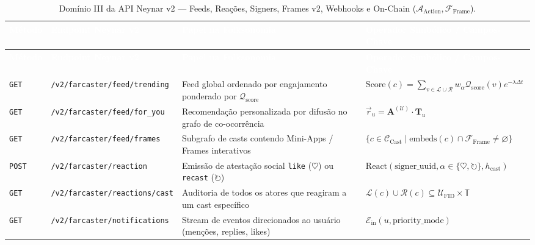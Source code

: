 \documentclass[11pt,a4paper]{article}
\begin{document}
\begin{longtable}{@{}p{1.15cm}>{\raggedright\arraybackslash}p{5.65cm}>{\raggedright\arraybackslash}p{4.15cm}>{\raggedright\arraybackslash}p{4.85cm}@{}}
\caption{Domínio III da API Neynar v2 --- Feeds, Reações, Signers, Frames v2, Webhooks e On-Chain ($\mathcal{A}_{\text{Action}}, \mathcal{F}_{\text{Frame}}$).}\label{tab:neynar_actions}\\
\toprule
\rowcolor{fcDeep}
\textcolor{white}{\textbf{Método}} & \textcolor{white}{\textbf{Endpoint Neynar v2}} & \textcolor{white}{\textbf{Papel na Folksonomia}} & \textcolor{white}{\textbf{Operador Simbólico / Campos-Chave}} \\
\midrule
\endfirsthead
\toprule
\rowcolor{fcDeep}
\textcolor{white}{\textbf{Método}} & \textcolor{white}{\textbf{Endpoint Neynar v2}} & \textcolor{white}{\textbf{Papel na Folksonomia}} & \textcolor{white}{\textbf{Operador Simbólico / Campos-Chave}} \\
\midrule
\endhead
\bottomrule
\endlastfoot
\texttt{GET} & \texttt{/v2/farcaster/feed/trending} & Feed global ordenado por engajamento ponderado por $\mathcal{Q}_{\text{score}}$ & $\text{Score}(c) = \sum_{v \in \mathcal{L}\cup\mathcal{R}} w_\alpha \mathcal{Q}_{\text{score}}(v) e^{-\lambda \Delta t}$ \\
\rowcolor{slateBg}
\texttt{GET} & \texttt{/v2/farcaster/feed/for\_you} & Recomendação personalizada por difusão no grafo de co-ocorrência & $\vec{r}_u = \mathbf{A}^{(\mathcal{U})} \cdot \mathbf{T}_u$ \\
\texttt{GET} & \texttt{/v2/farcaster/feed/frames} & Subgrafo de casts contendo Mini-Apps / Frames interativos & $\{c \in \mathcal{C}_{\text{Cast}} \mid \text{embeds}(c) \cap \mathcal{F}_{\text{Frame}} \neq \varnothing\}$ \\
\rowcolor{slateBg}
\texttt{POST} & \texttt{/v2/farcaster/reaction} & Emissão de atestação social \texttt{like} ($\heartsuit$) ou \texttt{recast} ($\circlearrowright$) & $\text{React}(\text{signer\_uuid}, \alpha \in \{\heartsuit,\circlearrowright\}, h_{\text{cast}})$ \\
\texttt{GET} & \texttt{/v2/farcaster/reactions/cast} & Auditoria de todos os atores que reagiram a um cast específico & $\mathcal{L}(c) \cup \mathcal{R}(c) \subseteq \mathcal{U}_{\text{FID}} \times \mathbb{T}$ \\
\rowcolor{slateBg}
\texttt{GET} & \texttt{/v2/farcaster/notifications} & Stream de eventos direcionados ao usuário (menções, replies, likes) & $\mathcal{E}_{\text{in}}(u, \text{priority\_mode})$ \\

\end{longtable}
\end{document}
